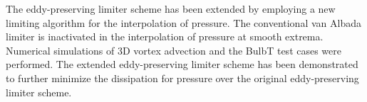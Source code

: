 The eddy-preserving limiter scheme has been extended by employing a new limiting algorithm for the interpolation of pressure. The conventional van Albada limiter is inactivated in the interpolation of pressure at smooth extrema. Numerical simulations of 3D vortex advection and the BulbT test cases were performed. The extended eddy-preserving limiter scheme has been demonstrated to further minimize the dissipation for pressure over the original eddy-preserving limiter scheme. 